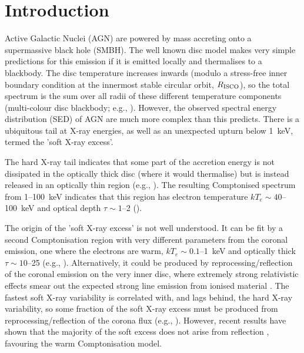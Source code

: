 \documentclass[a4paper,fleqn,usenatbib]{mnras}
\begin{document}

\section{Introduction}

Active Galactic Nuclei (AGN) are powered by mass accreting onto a
supermassive black hole (SMBH). The well known \cite{ss73} disc model makes very simple predictions for
this emission if it is emitted locally and thermalises to a blackbody.
The disc temperature increases inwards (modulo a stress-free inner
boundary condition at the innermost stable circular orbit, $R_{\rm
  ISCO}$), so the total spectrum is the sum over all radii of these
different temperature components (multi-colour disc blackbody; e.g., \citealt{mitsuda1984}).
However, the observed spectral energy distribution (SED) of AGN are
much more complex than this predicts.  There is a ubiquitous tail at
X-ray energies, as well as an unexpected upturn below 1~keV, termed
the 'soft X-ray excess'.

The hard X-ray tail indicates that some part of the accretion energy is
not dissipated in the optically thick disc (where it would thermalise)
but is instead released in an optically thin region (e.g., \citealt{elvis1994}). The resulting Comptonised spectrum from 1--100~keV indicates
that this region has electron temperature $kT_e\sim 40$--100~keV and
optical depth $\tau\sim 1$--2
(\citealt{lubinski2016,fabian2015}). 

The origin of the 'soft X-ray excess' is not well understood. It can
be fit by a second Comptonisation region with very different
parameters from the coronal emission, one where the electrons are
warm, $kT_e\sim 0.1$--1~keV and optically thick $\tau\sim 10$--25
(e.g., \citealt{magdziarz1998,czerny2003,marek2004b,porquet2004,petrucci2013,middei2018}).
Alternatively, it could be produced by reprocessing/reflection
of the coronal emission on the very inner disc, where extremely strong
relativistic effects smear out the expected strong line emission from
ionised material \citep{crummy2006}.  
The fastest soft X-ray variability is correlated with, and lags
behind, the hard X-ray variability, so 
some fraction of the soft X-ray excess 
must be produced from reprocessing/reflection of the corona flux
(e.g., \citealt{fabian2013,demarco2013}). However, 
recent results have shown that the majority of the soft excess does
not arise from reflection
\citep{509,5548,noda2013,matt2014,boissay2016,porquet2018}, favouring
the warm Comptonisation model.
\end{document}
